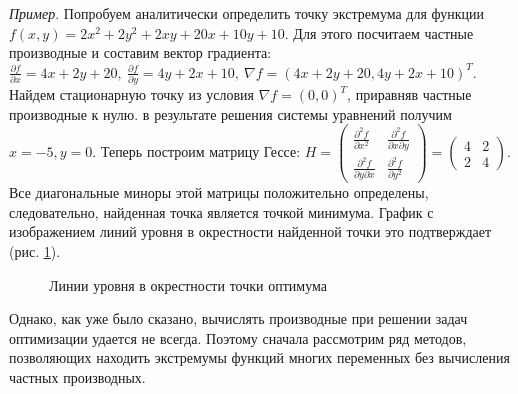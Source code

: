\documentclass[a4paper,12pt]{report}
\begin{document}
\textit{Пример}. Попробуем аналитически определить точку экстремума для функции $f(x, y) = 2x^{2} + 2y^{2} + 2xy + 20x + 10y + 10$. Для этого посчитаем частные производные и составим вектор градиента: $\frac{\partial f}{\partial x} = 4x + 2y + 20,\ \frac{\partial f}{\partial y} = 4y + 2x + 10, \ \nabla f = \left(4x + 2y + 20, 4y + 2x + 10\right)^{T}$. Найдем стационарную точку из условия $\nabla f = (0, 0)^{T}$, приравняв частные производные к нулю. в результате решения системы уравнений получим $x = -5, y = 0$. Теперь построим матрицу Гессе: $H = \begin{pmatrix} \frac{\partial^{2} f}{\partial x^{2}} & \frac{\partial^{2} f}{\partial x \partial y} \\ \frac{\partial^{2} f}{\partial y \partial x} & \frac{\partial^{2} f}{\partial y^{2}} \end{pmatrix} = \begin{pmatrix} 4 & 2 \\ 2 & 4 \end{pmatrix}$. Все диагональные миноры этой матрицы положительно определены, следовательно, найденная точка является точкой минимума. График с изображением линий уровня в окрестности найденной точки это подтверждает (рис. \ref{fig:fmp_analysis_example}).

\begin{figure}[ht]
\caption{Линии уровня в окрестности точки оптимума}
\label{fig:fmp_analysis_example}
\end{figure}

Однако, как уже было сказано, вычислять производные при решении задач оптимизации удается не всегда. Поэтому сначала рассмотрим ряд методов, позволяющих находить экстремумы функций многих переменных без вычисления частных производных.
\end{document}
